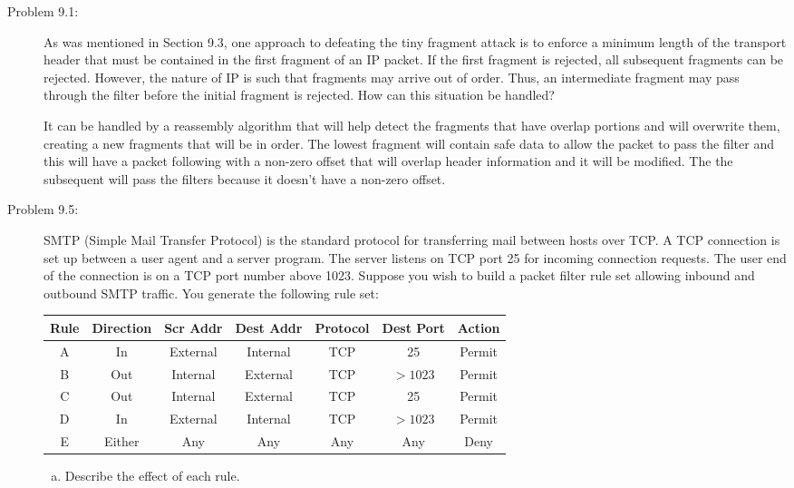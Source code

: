 \documentclass[12pt]{article}
\newcommand\tab[1][1cm]{\hspace*{#1}}
\begin{document}
\begin{description}
    \item[Problem 9.1:]{\color{grey}As was mentioned in Section 9.3, one approach to defeating the tiny fragment attack is to enforce a minimum length of the transport header that must be contained in the first fragment of an IP packet.  If the first fragment is rejected, all subsequent fragments can be rejected.  However, the nature of IP is such that fragments may arrive out of order.  Thus, an intermediate fragment may pass through the filter before the initial fragment is rejected.  How can this situation be handled?}\par
    \tab  It can be handled by a reassembly algorithm that will help detect the fragments that have overlap portions and will overwrite them, creating a new fragments that will be in order. The lowest fragment will contain safe data to allow the packet to pass the filter and this will have a packet following with a non-zero offset that will overlap header information and it will be modified. The the subsequent will pass the filters because it doesn't have a non-zero offset. 
    
    \item[Problem 9.5:]{\color{grey}SMTP (Simple Mail Transfer Protocol) is the standard protocol for transferring mail between hosts over TCP.  A TCP connection is set up between a user agent and a server program.  The server listens on TCP port 25 for incoming connection requests.  The user end of the connection is on a TCP port number above 1023.  Suppose you wish to build a packet filter rule set allowing inbound and outbound SMTP traffic.  You generate the following rule set:}
    \begin{center}
    \begin{tabular}{|c|c|c|c|c|c|c|}
      \hline
        \textbf{Rule} & \textbf{Direction} & \textbf{Scr Addr} & \textbf{Dest Addr} & \textbf{Protocol} & \textbf{Dest Port} & \textbf{Action} \\
        \hline
        A & In & External & Internal & TCP & 25 & Permit \\
        \hline
        B & Out & Internal & External & TCP & $>1023$ & Permit \\
        \hline
        C & Out & Internal & External & TCP & 25 & Permit \\
        \hline
        D & In & External & Internal & TCP & $>1023$ & Permit \\
        \hline
        E & Either & Any & Any & Any & Any & Deny \\
        \hline
      \end{tabular}
    \end{center} \par
    \begin{enumerate}[a.]
        \item {\color{grey}Describe the effect of each rule.}  
        

\end{enumerate}
\end{description}
\end{document}

